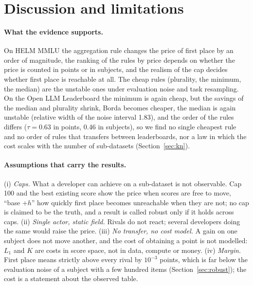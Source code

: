 \section{Discussion and limitations}
\label{sec:limits}

\paragraph{What the evidence supports.}
On HELM MMLU the aggregation rule changes the price of first place by an order of magnitude, the ranking of the rules by price depends on whether the price is counted in points or in subjects, and the realism of the cap decides whether first place is reachable at all. The cheap rules (plurality, the minimum, the median) are the unstable ones under evaluation noise and task resampling. On the Open LLM Leaderboard the minimum is again cheap, but the savings of the median and plurality shrink, Borda becomes cheaper, the median is again unstable (relative width of the noise interval 1.83), and the order of the rules differs ($\tau=0.63$ in points, 0.46 in subjects), so we find no single cheapest rule and no order of rules that transfers between leaderboards, nor a law in which the cost scales with the number of sub-datasets (Section~\ref{sec:kn}).

\paragraph{Assumptions that carry the results.}
(i) \emph{Caps.} What a developer can achieve on a sub-dataset is not observable. Cap 100 and the best existing score show the price when scores are free to move, ``base $+h$'' how quickly first place becomes unreachable when they are not; no cap is claimed to be the truth, and a result is called robust only if it holds across caps. (ii) \emph{Single actor, static field.} Rivals do not react; several developers doing the same would raise the price. (iii) \emph{No transfer, no cost model.} A gain on one subject does not move another, and the cost of obtaining a point is not modelled: $L_1$ and $K$ are costs in score space, not in data, compute or money. (iv) \emph{Margin.} First place means strictly above every rival by $10^{-3}$ points, which is far below the evaluation noise of a subject with a few hundred items (Section~\ref{sec:robust}); the cost is a statement about the observed table.

